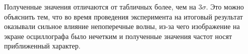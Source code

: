     Полученные значения отличаются от табличных более, чем на $3\sigma$. Это можно объяснить тем, что во время проведения эксперимента на итоговый результат оказывали сильное влияние непоперечные волны, из-за чего изображение на экране осциллографа было нечетким и полученные значения частот носят приближенный характер.



